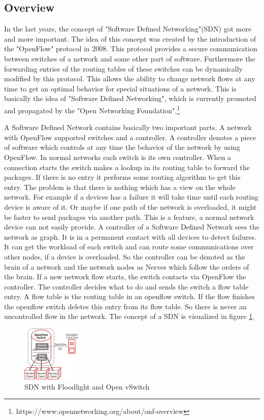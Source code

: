 \subsection{Overview}
In the last years, the concept of "Software Defined Networking"(SDN) got more and more important. The idea of this concept was created by the introduction of the "OpenFlow" protocol in 2008\cite{Mc2008}. This protocol provides a secure communication between switches of a network and some other part of software. Furthermore the forwarding entries of the routing tables of these switches can be dynamically modified by this protocol. This allows the ability to change network flows at any time to get an optimal behavior for special situations of a network. This is basically the idea of "Software Defined Networking", which is currently promoted and propagated by the "Open Networking Foundation".\footnote{https://www.opennetworking.org/about/onf-overview} 

A Software Defined Network contains basically two important parts. A network with OpenFlow supported switches and a controller. A controller denotes a piece of software which controls at any time the behavior of the network by using OpenFlow. In normal networks each switch is its own controller. When a connection starts the switch makes a lookup in its routing table to forward the packages. If there is no entry it performs some routing algorithm to get this entry. The problem is that there is nothing which has a view on the whole network. For example if a devices has a failure it will take time until each routing device is aware of it. Or maybe if one path of the network is overloaded, it might be faster to send packages via another path. This is a feature, a normal network device can not easily provide. A controller of a Software Defined Network sees the network as graph. It is in a permanent contact with all devices to detect failures. It can get the workload of each switch and can route some communications over other nodes, if a device is overloaded. So the controller can be denoted as the brain of a network and the network nodes as Nerves which follow the orders of the brain. If a new network flow starts, the switch contacts via OpenFlow the controller. The controller decides what to do and sends the switch a flow table entry. A flow table is the routing table in an openflow switch. If the flow finishes the openflow switch deletes this entry from its flow table. So there is never an uncontrolled flow in the network. The concept of a SDN is visualized in figure \ref{sdn}.\\
\begin{figure}[ht]
\centering
\includegraphics[width=0.25\textwidth]{img/sdn} 

\caption{SDN with Floodlight and Open vSwitch}
\label{sdn}
\end{figure}
 

